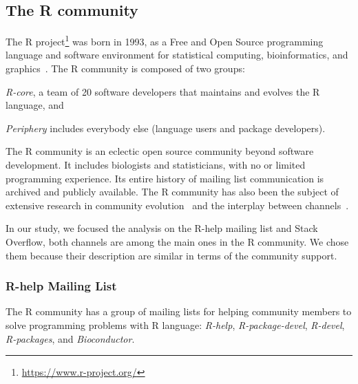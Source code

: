 \subsection{The R community}

The R project\footnote{\url{https://www.r-project.org/}} was born in 1993, as a Free and Open Source programming language and software environment for statistical computing, bioinformatics, and graphics~\cite{Ihaka1996}.
The R community is composed of two groups:
\begin{enumerate*}[label=(\arabic*)]
  \item \textit{R-core}, a team of 20 software developers that maintains and evolves the R language, and
  \item \textit{Periphery} includes everybody else (language users and package developers).
\end{enumerate*}

    The R community is an eclectic open source community beyond software development.
    It includes biologists and statisticians, with no or limited programming experience.
    Its entire history of mailing list communication is archived and publicly available.
    The R community has also been the subject of extensive research in community evolution~\cite{German2013} and the interplay between channels~\cite{Vasilescu2014c}.

    In our study, we focused the analysis on the R-help mailing list and Stack Overflow, both channels are among the main ones in the R community.
    We chose them because their description are similar in terms of the community support.

\subsubsection{R-help Mailing List}
    The R community has a group of mailing lists for helping community members to solve programming problems with R language: \emph{R-help}, \emph{R-package-devel}, \emph{R-devel}, \emph{R-packages}, and \emph{Bioconductor}.

